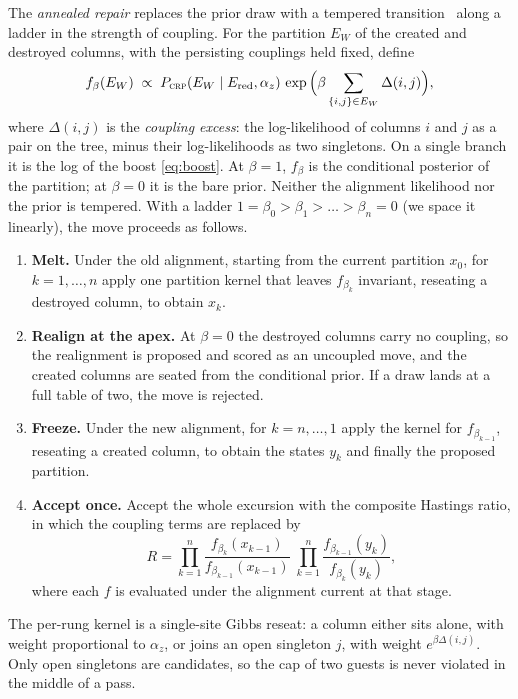 \documentclass[11pt]{article}
\newcommand{\CRP}{\textsc{crp}}
\begin{document}
The \emph{annealed repair} replaces the prior draw with a tempered
transition~\citep{Neal1996} along a ladder in the strength of coupling. For
the partition $E_W$ of the created and destroyed columns, with the
persisting couplings held fixed, define
\begin{equation}
\label{eq:ladder-target}
f_\beta(E_W)\;\propto\;P_{\CRP}(E_W\mid E_{\mathrm{red}},\alpha_z)\,
\exp\Big(\beta\sum_{\{i,j\}\in E_W}\Delta(i,j)\Big),
\end{equation}
where $\Delta(i,j)$ is the \emph{coupling excess}: the log-likelihood of
columns $i$ and $j$ as a pair on the tree, minus their log-likelihoods as
two singletons. On a single branch it is the log of the boost
\eqref{eq:boost}. At $\beta=1$, $f_\beta$ is the conditional posterior of the
partition; at $\beta=0$ it is the bare prior. Neither the alignment
likelihood nor the prior is tempered. With a ladder
$1=\beta_0>\beta_1>\dots>\beta_n=0$ (we space it linearly), the move proceeds
as follows.
\begin{enumerate}
\item \textbf{Melt.} Under the old alignment, starting from the current
partition $x_0$, for $k=1,\dots,n$ apply one partition kernel that leaves
$f_{\beta_k}$ invariant, reseating a destroyed column, to obtain $x_k$.
\item \textbf{Realign at the apex.} At $\beta=0$ the destroyed columns carry
no coupling, so the realignment is proposed and scored as an uncoupled
move, and the created columns are seated from the conditional
prior. If a draw lands at a full table of two, the move is rejected.
\item \textbf{Freeze.} Under the new alignment, for $k=n,\dots,1$ apply the
kernel for $f_{\beta_{k-1}}$, reseating a created column, to obtain the
states $y_k$ and finally the proposed partition.
\item \textbf{Accept once.} Accept the whole excursion with the composite
Hastings ratio, in which the coupling terms are replaced by
\begin{equation}
\label{eq:ladder-R}
R=\prod_{k=1}^{n}\frac{f_{\beta_k}(x_{k-1})}{f_{\beta_{k-1}}(x_{k-1})}
\;\prod_{k=1}^{n}\frac{f_{\beta_{k-1}}(y_k)}{f_{\beta_k}(y_k)},
\end{equation}
where each $f$ is evaluated under the alignment current at that stage.
\end{enumerate}
The per-rung kernel is a single-site Gibbs reseat: a column either sits
alone, with weight proportional to $\alpha_z$, or joins an open singleton $j$,
with weight $e^{\beta\Delta(i,j)}$. Only open singletons are candidates, so
the cap of two guests is never violated in the middle of a pass.
\end{document}
